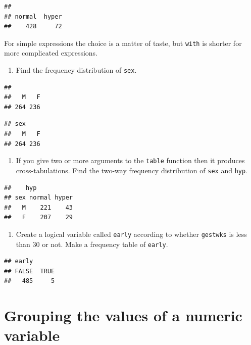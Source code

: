 \documentclass[
]{book}
\providecommand{\tightlist}{%
  \setlength{\itemsep}{0pt}\setlength{\parskip}{0pt}}
\begin{document}
\begin{verbatim}
## 
## normal  hyper 
##    428     72
\end{verbatim}

For simple expressions the choice is a matter of taste, but \texttt{with}
is shorter for more complicated expressions.

\begin{enumerate}
\def\labelenumi{\arabic{enumi}.}
\tightlist
\item
  Find the frequency distribution of \texttt{sex}.
\end{enumerate}

\begin{verbatim}
## 
##   M   F 
## 264 236
\end{verbatim}

\begin{verbatim}
## sex
##   M   F 
## 264 236
\end{verbatim}

\begin{enumerate}
\def\labelenumi{\arabic{enumi}.}
\setcounter{enumi}{1}
\tightlist
\item
  If you give two or more arguments to the \texttt{table} function
  then it produces cross-tabulations. Find the two-way frequency
  distribution of \texttt{sex} and \texttt{hyp}.
\end{enumerate}

\begin{verbatim}
##    hyp
## sex normal hyper
##   M    221    43
##   F    207    29
\end{verbatim}

\begin{enumerate}
\def\labelenumi{\arabic{enumi}.}
\setcounter{enumi}{2}
\tightlist
\item
  Create a logical variable called \texttt{early} according to whether \texttt{gestwks}
  is less than 30 or not. Make a frequency table of \texttt{early}.
\end{enumerate}

\begin{verbatim}
## early
## FALSE  TRUE 
##   485     5
\end{verbatim}

\section{Grouping the values of a numeric variable}\label{grouping-the-values-of-a-numeric-variable}
\end{document}
